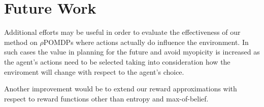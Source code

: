 \section{Future Work}

Additional efforts may be useful in order to evaluate the effectiveness of our method on
$\rho$POMDPs where actions actually do influence the environment. In such cases the value in
planning for the future and avoid myopicity is increased as the agent's actions need to be selected
taking into consideration how the enviroment will change with respect to the agent's choice.

Another improvement would be to extend our reward approximations with respect to reward functions
other than entropy and max-of-belief.
